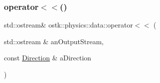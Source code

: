 \subsubsection{\texorpdfstring{operator$<$$<$()}{operator<<()}\hspace{0.1cm}{\footnotesize\ttfamily [3/3]}}
{\footnotesize\ttfamily std\+::ostream\& ostk\+::physics\+::data\+::operator$<$$<$ (\begin{DoxyParamCaption}\item[{std\+::ostream \&}]{an\+Output\+Stream,  }\item[{const \hyperlink{classostk_1_1physics_1_1data_1_1_direction}{Direction} \&}]{a\+Direction }\end{DoxyParamCaption})}

